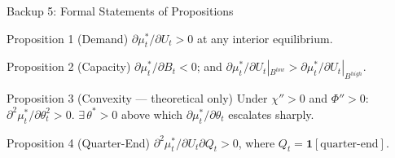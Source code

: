 \documentclass[aspectratio=169, 10pt]{beamer}
\newcommand{\mustar}{\mu_t^{*}}      %
\newcommand{\thetaT}{\theta_t}       %
\newcommand{\Bt}{B_t}                %
\newcommand{\Ut}{U_t}                %
\begin{document}
\begin{frame}{Backup 5: Formal Statements of Propositions}

  \begin{block}{Proposition 1 (Demand)}
    $\partial \mustar / \partial \Ut > 0$ at any interior equilibrium.
  \end{block}

  \begin{block}{Proposition 2 (Capacity)}
    $\partial \mustar / \partial \Bt < 0$; and
    $\partial \mustar / \partial \Ut |_{B^{low}} > \partial \mustar / \partial \Ut |_{B^{high}}$.
  \end{block}

  \begin{block}{Proposition 3 (Convexity --- theoretical only)}
    Under $\chi'' > 0$ and $\Phi'' > 0$: $\partial^2 \mustar / \partial \thetaT^2 > 0$.
    $\exists\, \theta^* > 0$ above which $\partial \mustar / \partial \thetaT$ escalates sharply.
  \end{block}

  \begin{block}{Proposition 4 (Quarter-End)}
    $\partial^2 \mustar / \partial \Ut \partial Q_t > 0$, where $Q_t = \mathbf{1}[\text{quarter-end}]$.
  \end{block}

\end{frame}

\end{document}
